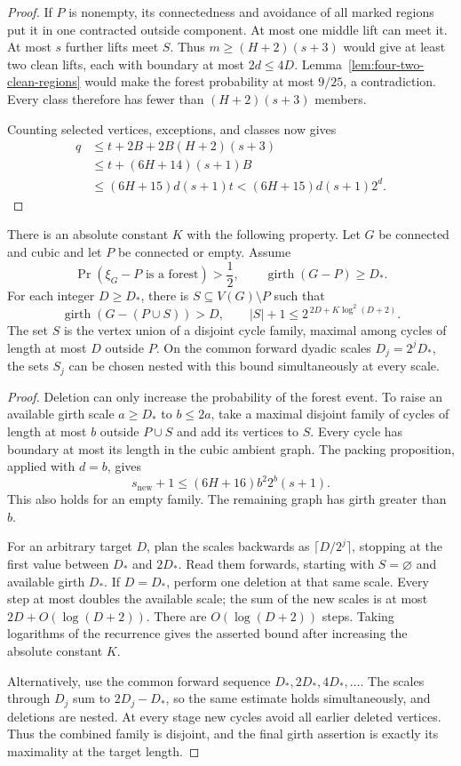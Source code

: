 \begin{proof}
If $P$ is nonempty, its connectedness and avoidance of all marked regions put it in one contracted outside component.
At most one middle lift can meet it.
At most $s$ further lifts meet $S$.
Thus $m\ge(H+2)(s+3)$ would give at least two clean lifts, each with boundary at most $2d\le4D$.
Lemma~\ref{lem:four-two-clean-regions} would make the forest probability at most $9/25$, a contradiction.
Every class therefore has fewer than $(H+2)(s+3)$ members.

Counting selected vertices, exceptions, and classes now gives
\begin{align*}
 q&\le t+2B+2B(H+2)(s+3)\\
  &\le t+(6H+14)(s+1)B\\
  &\le(6H+15)d(s+1)t
   <(6H+15)d(s+1)2^d.
\end{align*}
\end{proof}

\begin{theorem}
\label{thm:four-excess-free-girth-raising}
There is an absolute constant $K$ with the following property.
Let $G$ be connected and cubic and let $P$ be connected or empty.
Assume
\[
 \Pr(\xi_G-P\text{ is a forest})>\frac12,
 \qquad \operatorname{girth}(G-P)\ge D_*.
\]
For each integer $D\ge D_*$, there is $S\subseteq V(G)\setminus P$ such that
\[
 \operatorname{girth}(G-(P\cup S))>D,
 \qquad |S|+1\le2^{\,2D+K\log^2(D+2)}.
\]
The set $S$ is the vertex union of a disjoint cycle family, maximal among cycles of length at most $D$ outside $P$.
On the common forward dyadic scales $D_j=2^jD_*$, the sets $S_j$ can be chosen nested with this bound simultaneously at every scale.
\end{theorem}

\begin{proof}
Deletion can only increase the probability of the forest event.
To raise an available girth scale $a\ge D_*$ to $b\le2a$, take a maximal disjoint family of cycles of length at most $b$ outside $P\cup S$ and add its vertices to $S$.
Every cycle has boundary at most its length in the cubic ambient graph.
The packing proposition, applied with $d=b$, gives
\[
 s_{\mathrm{new}}+1
 \le(6H+16)b^2 2^b(s+1).
\]
This also holds for an empty family.
The remaining graph has girth greater than $b$.

For an arbitrary target $D$, plan the scales backwards as $\lceil D/2^j\rceil$, stopping at the first value between $D_*$ and $2D_*$.
Read them forwards, starting with $S=\varnothing$ and available girth $D_*$.
If $D=D_*$, perform one deletion at that same scale.
Every step at most doubles the available scale; the sum of the new scales is at most $2D+O(\log(D+2))$.
There are $O(\log(D+2))$ steps.
Taking logarithms of the recurrence gives the asserted bound after increasing the absolute constant $K$.

Alternatively, use the common forward sequence $D_*,2D_*,4D_*,\ldots$.
The scales through $D_j$ sum to $2D_j-D_*$, so the same estimate holds simultaneously, and deletions are nested.
At every stage new cycles avoid all earlier deleted vertices.
Thus the combined family is disjoint, and the final girth assertion is exactly its maximality at the target length.
\end{proof}

